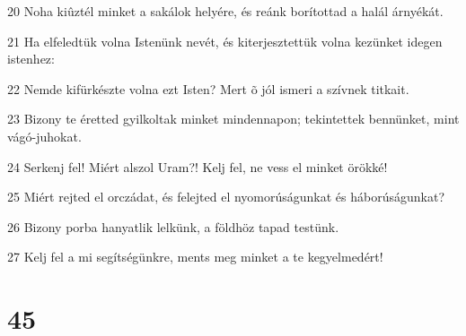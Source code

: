 \par 20 Noha kiûztél minket a sakálok helyére, és reánk borítottad a halál árnyékát.
\par 21 Ha elfeledtük volna Istenünk nevét, és kiterjesztettük volna kezünket idegen istenhez:
\par 22 Nemde kifürkészte volna ezt Isten? Mert õ jól ismeri a szívnek titkait.
\par 23 Bizony te éretted gyilkoltak minket mindennapon; tekintettek bennünket, mint vágó-juhokat.
\par 24 Serkenj fel! Miért alszol Uram?! Kelj fel, ne vess el minket örökké!
\par 25 Miért rejted el orczádat, és felejted el nyomorúságunkat és háborúságunkat?
\par 26 Bizony porba hanyatlik lelkünk, a földhöz tapad testünk.
\par 27 Kelj fel a mi segítségünkre, ments meg minket a te kegyelmedért!

\chapter{45}

